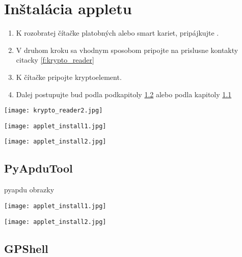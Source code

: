 \documentclass[12pt,a4wide,oneside,openright]{report}
\begin{document}
\section{Inštalácia appletu} \label{s_applet_install}
	\begin{enumerate}
		\item K rozobratej čítačke platobných alebo smart kariet, pripájkujte . 
		\item V druhom kroku sa vhodnym sposobom pripojte na prislusne kontakty  citacky \ref{f:krypto_reader}
		\item K čítačke pripojte kryptoelement.
		\item Dalej postupujte bud podla podkapitoly \ref{s_applet_gpshell} alebo podla kapitoly  \ref{s_applet_pytool}
	\end{enumerate}
	\begin{figure*}[h]
		\centering
		\texttt{[image: krypto\_reader2.jpg]}
		\caption{Pripojenie kryptoelementu k čítačke kariet.}
		\label{f:krypto_reader}
	\end{figure*}
	
	\begin{figure*}[h]
		\centering
		\texttt{[image: applet\_install1.jpg]}
		\caption{}
		\label{f:applet_install1}
	\end{figure*}
	\begin{figure*}[h]
		\centering
		\texttt{[image: applet\_install2.jpg]}
		\caption{}
		\label{f:applet_install2}
	\end{figure*}

\subsection{PyApduTool} \label{s_applet_pytool}
	pyapdu
	obrazky 
		\begin{figure*}[h]
			\centering
			\texttt{[image: applet\_install1.jpg]}
			\caption{Inštalácia appletu cez PyApduTool.}
			\label{f:i_applet_pyapdu}
		\end{figure*}
		\begin{figure*}[h]
			\centering
			\texttt{[image: applet\_install2.jpg]}
			\caption{Inštalácia appletu cez PyApduTool.}
			\label{f:i_applet_pyapdu2}
		\end{figure*}
\subsection{GPShell} \label{s_applet_gpshell}
	
\end{document}
